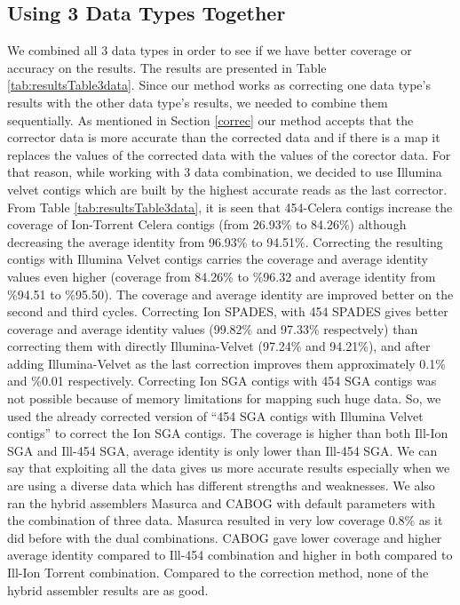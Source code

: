 \documentclass{llncs}
\begin{document}
\subsection{Using 3 Data Types Together}
\label{3data}
We combined all 3 data types in order to see if we have better coverage or accuracy on the results. The results are presented in Table \ref{tab:resultsTable3data}. Since our method works as correcting one data type's results with the other data type's results, we needed to combine them sequentially. As mentioned in Section \ref{correc} our method accepts that the corrector data is more accurate than the corrected data and if there is a map it replaces the values of the corrected data with the values of the corector data. For that reason, while working with 3 data combination, we decided to use Illumina velvet contigs which are built by the highest accurate reads as the last corrector. From Table \ref{tab:resultsTable3data}, it is seen that 454-Celera contigs increase the coverage of Ion-Torrent Celera contigs (from 26.93\% to 84.26\%) although decreasing the average identity from 96.93\% to 94.51\%. Correcting the resulting contigs with Illumina Velvet contigs carries the coverage and average identity values even higher (coverage from 84.26\% to \%96.32 and average identity from \%94.51 to \%95.50). The coverage and average identity are improved better on the second and third cycles. Correcting Ion SPADES, with 454 SPADES gives better coverage and average identity values (99.82\% and 97.33\% respectvely) than correcting them with directly Illumina-Velvet (97.24\% and 94.21\%), and after adding Illumina-Velvet as the last correction improves them approximately 0.1\% and \%0.01 respectively. Correcting Ion SGA contigs with 454 SGA contigs was not possible because of memory limitations for mapping such huge data. So, we used the already corrected version of ``454 SGA contigs with Illumina Velvet contigs'' to correct the Ion SGA contigs. The coverage is higher than both Ill-Ion SGA and Ill-454 SGA, average identity is only lower than Ill-454 SGA. We can say that exploiting all the data gives us more accurate results especially when we are using a diverse data which has different strengths and weaknesses.
We also ran the hybrid assemblers Masurca and CABOG with default parameters with the combination of three data. Masurca resulted in very low coverage 0.8\% as it did before with the dual combinations. CABOG gave lower coverage and higher average identity compared to Ill-454 combination and higher in both compared to Ill-Ion Torrent combination. Compared to the correction method, none of the hybrid assembler results are as good.
\end{document}
